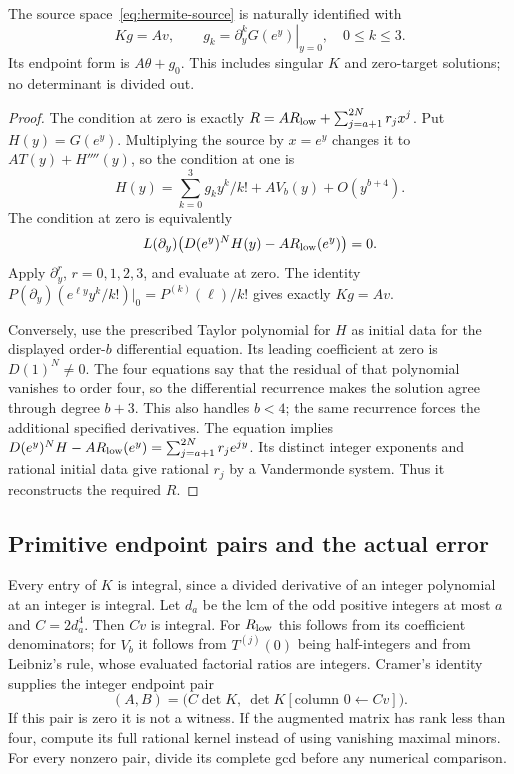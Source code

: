 \begin{proposition}\label{prop:hermite-map}
The source space~\eqref{eq:hermite-source} is naturally identified with
\[
 Kg=Av,\qquad g_k=\left.\partial_y^kG(e^y)\right|_{y=0},\quad0\leq k\leq3.
\]
Its endpoint form is $A\theta+g_0$. This includes singular $K$ and
zero-target solutions; no determinant is divided out.
\end{proposition}
\begin{proof}
The condition at zero is exactly
$R=AR_{\rm low}+\sum_{j=a+1}^{2N}r_jx^j$.
Put $H(y)=G(e^y)$. Multiplying the source by $x=e^y$ changes it to
$AT(y)+H''''(y)$, so the condition at one is
\[
 H(y)=\sum_{k=0}^3g_ky^k/k!+AV_b(y)+O(y^{b+4}).
\]
The condition at zero is equivalently
\[
 L(\partial_y)\bigl(D(e^y)^NH(y)-AR_{\rm low}(e^y)\bigr)=0.
\]
Apply $\partial_y^r$, $r=0,1,2,3$, and evaluate at zero. The identity
$P(\partial_y)(e^{\ell y}y^k/k!)|_0=P^{(k)}(\ell)/k!$
gives exactly $Kg=Av$.

Conversely, use the prescribed Taylor polynomial for $H$ as initial
data for the displayed order-$b$ differential equation. Its leading
coefficient at zero is $D(1)^N\ne0$. The four equations say that the
residual of that polynomial vanishes to order four, so the differential
recurrence makes the solution agree through degree $b+3$.
This also handles $b<4$; the same recurrence forces the additional
specified derivatives. The equation implies
$D(e^y)^NH-AR_{\rm low}(e^y)=\sum_{j=a+1}^{2N}r_je^{jy}$.
Its distinct integer exponents and rational initial data give rational
$r_j$ by a Vandermonde system. Thus it reconstructs the required $R$.
\end{proof}

\subsection{Primitive endpoint pairs and the actual error}
Every entry of $K$ is integral, since a divided derivative of an integer
polynomial at an integer is integral. Let $d_a$ be the lcm of the odd
positive integers at most $a$ and $C=2d_a^4$. Then $Cv$ is integral.
For $R_{\rm low}$ this follows from its coefficient denominators;
for $V_b$ it follows from $T^{(j)}(0)$ being half-integers and from
Leibniz's rule, whose evaluated factorial ratios are integers.
Cramer's identity supplies the integer endpoint pair
\begin{equation}\label{eq:hermite-pair}
 (A,B)=\bigl(C\det K,\ \det K[\text{column }0\leftarrow Cv]\bigr).
\end{equation}
If this pair is zero it is not a witness. If the augmented matrix has
rank less than four, compute its full rational kernel instead of using
vanishing maximal minors. For every nonzero pair, divide its complete
gcd before any numerical comparison.

